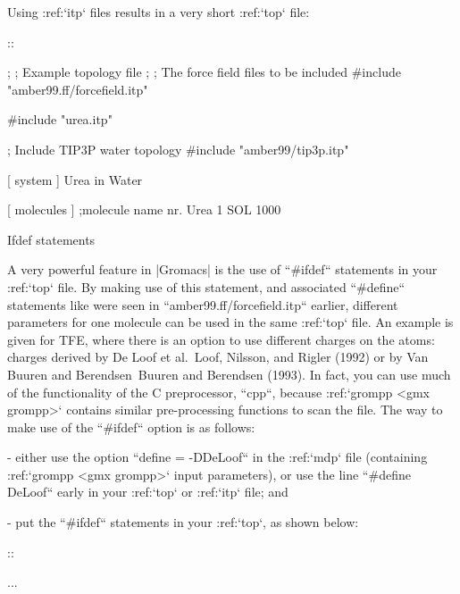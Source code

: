 Using :ref:`itp` files results in a very short
:ref:`top` file:

::

    ;
    ;       Example topology file
    ;
    ; The force field files to be included
    #include "amber99.ff/forcefield.itp"

    #include "urea.itp"

    ; Include TIP3P water topology
    #include "amber99/tip3p.itp"

    [ system ]
    Urea in Water

    [ molecules ]
    ;molecule name   nr.
    Urea             1
    SOL              1000

Ifdef statements
~~~~~~~~~~~~~~~~

A very powerful feature in |Gromacs| is the use of ``#ifdef``
statements in your :ref:`top` file. By making use of this
statement, and associated ``#define`` statements like were
seen in ``amber99.ff/forcefield.itp`` earlier,
different parameters for one molecule can be used in the same
:ref:`top` file. An example is given for TFE, where there is
an option to use different charges on the atoms: charges derived by De
Loof et al. Loof, Nilsson, and Rigler (1992) or by Van Buuren and
Berendsen Buuren and Berendsen (1993). In fact, you can use much of the
functionality of the C preprocessor, ``cpp``, because
:ref:`grompp <gmx grompp>` contains similar pre-processing functions to scan
the file. The way to make use of the ``#ifdef`` option is as
follows:

-  either use the option ``define = -DDeLoof`` in the
   :ref:`mdp` file (containing :ref:`grompp <gmx grompp>` input
   parameters), or use the line ``#define DeLoof`` early in
   your :ref:`top` or :ref:`itp` file; and

-  put the ``#ifdef`` statements in your
   :ref:`top`, as shown below:


::

    ...



